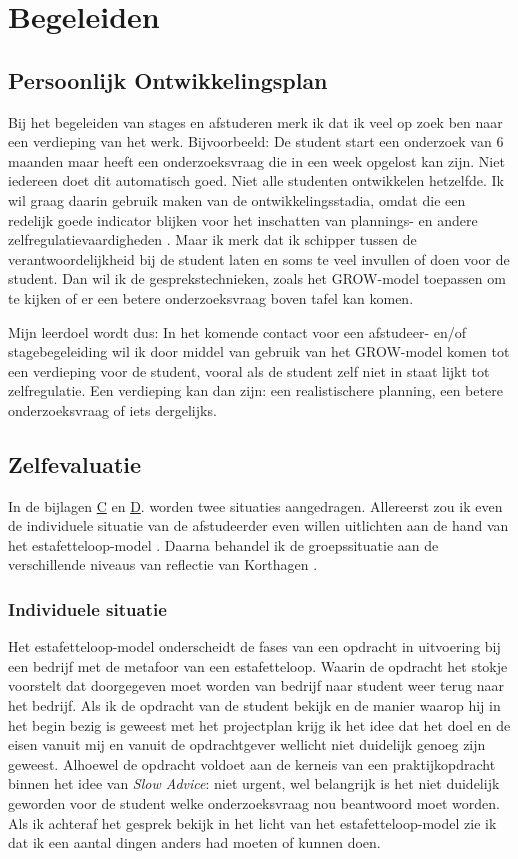 \section{Begeleiden}
\subsection{Persoonlijk Ontwikkelingsplan}

Bij het begeleiden van stages en afstuderen merk ik dat ik veel op zoek ben naar een verdieping van het werk. Bijvoorbeeld: De student start een onderzoek van 6 maanden maar heeft een onderzoeksvraag die in een week opgelost kan zijn. Niet iedereen doet dit automatisch goed. Niet alle studenten ontwikkelen hetzelfde. Ik wil graag daarin gebruik maken van de ontwikkelingsstadia, omdat die een redelijk goede indicator blijken voor het inschatten van plannings- en andere zelfregulatievaardigheden \cite{luken2008mogelijkheid}. Maar ik merk dat ik schipper tussen de verantwoordelijkheid bij de student laten en soms te veel invullen of doen voor de student. Dan wil ik de gesprekstechnieken, zoals het GROW-model toepassen om te kijken of er een betere onderzoeksvraag boven tafel kan komen.

Mijn leerdoel wordt dus:
In het komende contact voor een afstudeer- en/of stagebegeleiding wil ik door middel van gebruik van het GROW-model komen tot een verdieping voor de student, vooral als de student zelf niet in staat lijkt tot zelfregulatie. Een verdieping kan dan zijn: een realistischere planning, een betere onderzoeksvraag of iets dergelijks.

\subsection{Zelfevaluatie}
In de bijlagen \hyperref[sec:groep]{C} en \hyperref[sec:individu]{D}. worden twee situaties aangedragen. Allereerst zou ik even de individuele situatie van de afstudeerder even willen uitlichten aan de hand van het estafetteloop-model \cite{methorstkaders}. Daarna behandel ik de groepssituatie aan de verschillende niveaus van reflectie van Korthagen \cite{korthagen2002niveaus}.

\subsubsection{Individuele situatie}
Het estafetteloop-model onderscheidt de fases van een opdracht in uitvoering bij een bedrijf met de metafoor van een estafetteloop. Waarin de opdracht het stokje voorstelt dat doorgegeven moet worden van bedrijf naar student weer terug naar het bedrijf. Als ik de opdracht van de student bekijk en de manier waarop hij in het begin bezig is geweest met het projectplan krijg ik het idee dat het doel en de eisen vanuit mij en vanuit de opdrachtgever wellicht niet duidelijk genoeg zijn geweest. 
Alhoewel de opdracht voldoet aan de kerneis van een praktijkopdracht binnen het idee van \textit{Slow Advice}: niet urgent, wel belangrijk \cite{methorstslow} is het niet duidelijk geworden voor de student welke onderzoeksvraag nou beantwoord moet worden. Als ik achteraf het gesprek bekijk in het licht van het estafetteloop-model zie ik dat ik een aantal dingen anders had moeten of kunnen doen.

